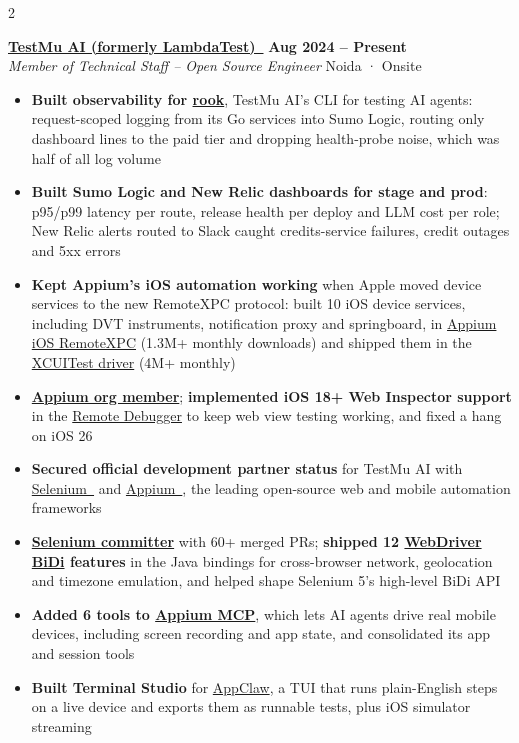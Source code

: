 \documentclass[letterpaper,11pt]{article}
\newcommand{\resumeItem}[1]{
  \item\small{#1}
}
\newcommand{\resumeItemListStart}{\begin{itemize}[leftmargin=0.15in, itemsep=3pt, topsep=3pt, parsep=0pt]}
\newcommand{\resumeItemListEnd}{\end{itemize}\vspace{-5pt}}
\begin{document}
\begin{center}
\begin{paracol}{2}
		\item
		\textbf{\href{https://www.testmuai.com/}{TestMu AI (formerly LambdaTest)~\faLink}} \hfill \textbf{Aug 2024 -- Present}\\
		\textit{Member of Technical Staff -- Open Source Engineer} \hfill Noida · Onsite
		\resumeItemListStart
		\resumeItem{\textbf{Built observability for \href{https://github.com/LambdaTest/rook}{rook}}, TestMu AI's CLI for testing AI agents: request-scoped logging from its Go services into Sumo Logic, routing only dashboard lines to the paid tier and dropping health-probe noise, which was half of all log volume}
		\resumeItem{\textbf{Built Sumo Logic and New Relic dashboards for stage and prod}: p95/p99 latency per route, release health per deploy and LLM cost per role; New Relic alerts routed to Slack caught credits-service failures, credit outages and 5xx errors}
		\resumeItem{\textbf{Kept Appium's iOS automation working} when Apple moved device services to the new RemoteXPC protocol: built 10 iOS device services, including DVT instruments, notification proxy and springboard, in \href{https://github.com/appium/appium-ios-remotexpc}{Appium iOS RemoteXPC} (1.3M+ monthly downloads) and shipped them in the \href{https://github.com/appium/appium-xcuitest-driver}{XCUITest driver} (4M+ monthly)}
		\resumeItem{\textbf{\href{https://github.com/appium}{Appium org member}}; \textbf{implemented iOS 18+ Web Inspector support} in the \href{https://github.com/appium/appium-remote-debugger}{Remote Debugger} to keep web view testing working, and fixed a hang on iOS 26}
		\resumeItem{\textbf{Secured official development partner status} for TestMu AI with \href{https://www.selenium.dev/blog/2025/lambdatest-selenium-partnership/}{Selenium~\faLink} and \href{https://appium.io/docs/en/3.2/blog/2025/11/25/announcing-lambdatest-as-appiums-newest-development-partner/}{Appium~\faLink}, the leading open-source web and mobile automation frameworks}
		\resumeItem{\textbf{\href{https://www.selenium.dev/project/structure/\#selenium_committers}{Selenium committer}} with 60+ merged PRs; \textbf{shipped 12 \href{https://w3c.github.io/webdriver-bidi/}{WebDriver BiDi} features} in the Java bindings for cross-browser network, geolocation and timezone emulation, and helped shape Selenium 5's high-level BiDi API}
		\resumeItem{\textbf{Added 6 tools to \href{https://github.com/appium/appium-mcp}{Appium MCP}}, which lets AI agents drive real mobile devices, including screen recording and app state, and consolidated its app and session tools}
		\resumeItem{\textbf{Built Terminal Studio} for \href{https://github.com/appclawhq/AppClaw}{AppClaw}, a TUI that runs plain-English steps on a live device and exports them as runnable tests, plus iOS simulator streaming}
		\resumeItemListEnd
		

\end{paracol}
\end{center}
\end{document}
